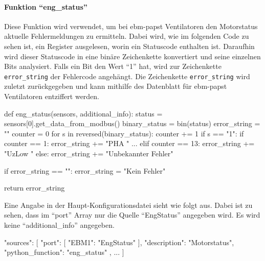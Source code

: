 \paragraph{Funktion \enquote{eng\_status}}
Diese Funktion wird verwendet, um bei ebm-papst Ventilatoren den Motorstatus \bzw aktuelle Fehlermeldungen zu ermitteln. Dabei wird, wie im folgenden Code zu sehen ist, ein Register ausgelesen, worin ein Statuscode enthalten ist. Daraufhin wird dieser Statuscode in eine binäre Zeichenkette konvertiert und seine einzelnen Bits analysiert. Falls ein Bit den Wert \enquote{1} hat, wird zur Zeichenkette \lstinline{error_string} der Fehlercode angehängt. Die Zeichenkette \lstinline{error_string} wird zuletzt zurückgegeben und kann mithilfe des Datenblatt für ebm-papst Ventilatoren \cite[vgl.][119]{ebmpapst:2020} entziffert werden. 

\begin{pythoncode}
def eng_status(sensors, additional_info):
	status = sensors[0].get_data_from_modbus()
	binary_status = bin(status)
	error_string = ""
	counter = 0
	for s in reversed(binary_status):
		counter += 1
		if s == "1":
			if counter == 1:
				error_string += "PHA "
			...
			elif counter == 13:
				error_string += "UzLow "
			else:
				error_string += "Unbekannter Fehler"
			
	if error_string == "":
		error_string = "Kein Fehler"
	
	return error_string
\end{pythoncode}

Eine Angabe in der Haupt-Konfigurationsdatei sieht wie folgt aus. Dabei ist zu sehen, dass im \enquote{port} Array nur die Quelle \enquote{EngStatus} angegeben wird. Es wird keine \enquote{additional\_info} angegeben.

\begin{jsoncode}
"sources": [
	{
		"port": [
			{"EBM1": "EngStatus"}
		],
		"description": "Motorstatus",
		"python_function": "eng_status"
	},
	...
]
\end{jsoncode}



